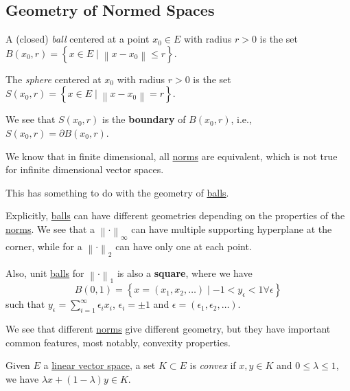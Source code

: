\subsection{Geometry of Normed Spaces}
\begin{definition}[Ball]\label{def:ball}
	A (closed) \emph{ball} centered at a point \(x_0\in E\) with radius \(r>0\) is the set \(B(x_0, r) = \left\{ x\in E\mid \left\lVert x - x_0\right\rVert \leq r \right\} \).
\end{definition}

\begin{definition}[Sphere]\label{def:sphere}
	The \emph{sphere} centered at \(x_0\) with radius \(r>0\) is the set \(S(x_0, r) = \left\{ x\in E\mid \left\lVert x - x_0\right\rVert = r\right\} \).
\end{definition}

\begin{remark}
	We see that \(S(x_0, r)\) is the \textbf{boundary} of \(B(x_0, r)\), i.e., \(S(x_0, r) = \partial B(x_0, r)\).
\end{remark}

\begin{note}
	We know that in finite dimensional, all \hyperref[def:norm]{norms} are equivalent, which is not true for infinite dimensional vector spaces.

	This has something to do with the geometry of \hyperref[def:ball]{balls}.
\end{note}

Explicitly, \hyperref[def:ball]{balls} can have different geometries depending on the properties of the \hyperref[def:norm]{norms}. We see that a \(\left\lVert \cdot\right\rVert _{\infty}\) can have multiple supporting hyperplane at the corner, while for a \(\left\lVert \cdot\right\rVert _2\) can have only one at each point.

Also, unit \hyperref[def:ball]{balls} for \(\left\lVert \cdot\right\rVert _1\) is also a \textbf{square}, where we have
\[
	B(0, 1) = \left\{ x = (x_1, x_2, \ldots)\mid -1 < y_{\epsilon } < 1 \forall \epsilon\right\}
\]
such that \(y_{\epsilon } = \sum_{i=1}^{\infty} \epsilon _i x_i \), \(\epsilon _i = \pm 1\) and \(\epsilon = (\epsilon _1, \epsilon _2, \ldots  )\).

We see that different \hyperref[def:norm]{norms} give different geometry, but they have important common features, most notably, convexity properties.

\begin{definition}\label{def:convex-set}
	Given \(E\) a \hyperref[def:linear-vector-space]{linear vector space}, a set \(K\subset E\) is \emph{convex} if \(x, y\in K\) and \(0 \leq \lambda \leq 1\), we have \(\lambda x + (1 - \lambda )y\in K\).
\end{definition}

